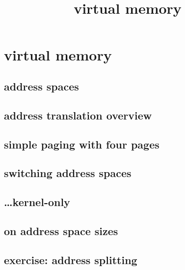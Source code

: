 \graphicspath{{./figures/}}
\title{virtual memory}
\date{}

\begin{frame}
    \titlepage
\end{frame}

\section{virtual memory}

\subsection{address spaces}


\subsection{address translation overview}




\subsection{simple paging with four pages}



\subsection{switching address spaces}



\subsection{\ldots kernel-only}



\subsection{on address space sizes}



\subsection{exercise: address splitting}

